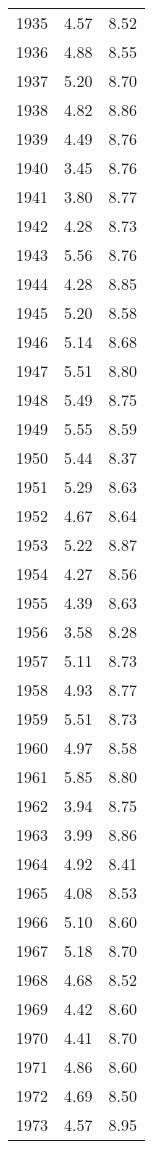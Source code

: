 \begin{tabular}{lrr}
1935 &    4.57 &    8.52 \\
1936 &    4.88 &    8.55 \\
1937 &    5.20 &    8.70 \\
1938 &    4.82 &    8.86 \\
1939 &    4.49 &    8.76 \\
1940 &    3.45 &    8.76 \\
1941 &    3.80 &    8.77 \\
1942 &    4.28 &    8.73 \\
1943 &    5.56 &    8.76 \\
1944 &    4.28 &    8.85 \\
1945 &    5.20 &    8.58 \\
1946 &    5.14 &    8.68 \\
1947 &    5.51 &    8.80 \\
1948 &    5.49 &    8.75 \\
1949 &    5.55 &    8.59 \\
1950 &    5.44 &    8.37 \\
1951 &    5.29 &    8.63 \\
1952 &    4.67 &    8.64 \\
1953 &    5.22 &    8.87 \\
1954 &    4.27 &    8.56 \\
1955 &    4.39 &    8.63 \\
1956 &    3.58 &    8.28 \\
1957 &    5.11 &    8.73 \\
1958 &    4.93 &    8.77 \\
1959 &    5.51 &    8.73 \\
1960 &    4.97 &    8.58 \\
1961 &    5.85 &    8.80 \\
1962 &    3.94 &    8.75 \\
1963 &    3.99 &    8.86 \\
1964 &    4.92 &    8.41 \\
1965 &    4.08 &    8.53 \\
1966 &    5.10 &    8.60 \\
1967 &    5.18 &    8.70 \\
1968 &    4.68 &    8.52 \\
1969 &    4.42 &    8.60 \\
1970 &    4.41 &    8.70 \\
1971 &    4.86 &    8.60 \\
1972 &    4.69 &    8.50 \\
1973 &    4.57 &    8.95 \\

\end{tabular}
